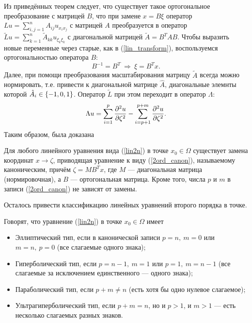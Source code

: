     Из приведённых теорем следует, что существует такое ортогональное преобразование с матрицей $B$, что при замене $x = B\xi$ оператор
    $Lu = \sum_{i,j = 1}^n A_{ij}u_{x_i x_j}$ с матрицей $A$ преобразуется в оператор $\tilde{L}u = \sum_{k = 1}^n \tilde{A}_{kk} u_{\xi_k \xi_k}$
    с диагональной матрицей $\tilde{A} = B^T AB$. Чтобы выразить новые переменные через старые, как в (\ref{lin_transform}), воспользуемся ортогональностью
    оператора $B$:
    \begin{equation*}
        B^{-1} = B^T \: \Rightarrow \: \xi = B^T x.
    \end{equation*}
    Далее, при помощи преобразования масштабирования матрицу $\tilde{A}$ всегда можно нормировать, т.е. привести к диагональной матрице $\hat{A}$, диагональные элемнты которой $\hat{A}_i \in \left\{{-1,0,1}\right\}$. Оператор $\tilde{L}$ при этом переходит в оператор $\Lambda$:
    \begin{equation}
        \Lambda u = \sum_{i = 1}^p \frac{\partial^2u}{\partial{\zeta}^2} - \sum_{i = p+1}^{p+m} \frac{\partial^2u}{\partial{\zeta}^2}. \label{2ord_canon}
    \end{equation}
\newpage
    Таким образом, была доказана
    \begin{theorem}
        Для любого линейного уравнения вида (\ref{lin2n}) в точке $x_0 \in \Omega$ существует замена координат $x \rightarrow \zeta$,
        приводящая уравнение к виду (\ref{2ord_canon}), называемому каноническим, причём $\zeta = MB^T x$, где $M$ --- диагональная матрица
        (нормировочная), а $B$ --- ортогональная матрица. Кроме того, числа $p$ и $m$ в записи (\ref{2ord_canon}) не зависят от замены.
    \end{theorem}
    Осталось привести классификацию линейных уравнений второго порядка в точке.
    \begin{Def}
        Говорят, что уравнение (\ref{lin2n}) в точке $x_0 \in \Omega$ имеет
        \begin{itemize}
            \item Эллиптический тип, если в канонической записи $p = n,\: m = 0$ или $m = n,\: p = 0$ (все слагаемые одного знака);
            \item Гиперболический тип, если $p = n-1,\: m = 1$ или $p = 1,\: m = n-1$ (все слагаемые за исключением единственного --- одного знака);
            \item Параболический тип, если $p + m \not= n$ (есть хотя бы одно нулевое слагаемое);
            \item Ультрагиперболический тип, если $p + m = n$, но и $p > 1$, и $m > 1$ --- есть несколько слагаемых разных знаков.
        \end{itemize}
    \end{Def}
